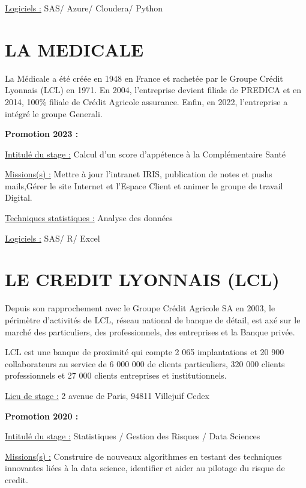 \documentclass[
  letterpaper,
  DIV=11,
  numbers=noendperiod]{scrreprt}
\begin{document}
\uline{Logiciels :} SAS/ Azure/ Cloudera/ Python

\hypertarget{la-medicale}{%
\section{\texorpdfstring{\textbf{LA
MEDICALE}}{LA MEDICALE}}\label{la-medicale}}

La Médicale a été créée en 1948 en France et rachetée par le Groupe
Crédit Lyonnais (LCL) en 1971. En 2004, l'entreprise devient filiale de
PREDICA et en 2014, 100\% filiale de Crédit Agricole assurance. Enfin,
en 2022, l'entreprise a intégré le groupe Generali.

\textbf{Promotion 2023 :}

\uline{Intitulé du stage :} Calcul d'un score d'appétence à la
Complémentaire Santé

\uline{Missions(s) :} Mettre à jour l'intranet IRIS, publication de
notes et pushs mails,Gérer le site Internet et l'Espace Client et animer
le groupe de travail Digital.

\uline{Techniques statistiques :} Analyse des données

\uline{Logiciels :} SAS/ R/ Excel

\hypertarget{le-credit-lyonnais-lcl}{%
\section{\texorpdfstring{\textbf{LE CREDIT LYONNAIS
(LCL)}}{LE CREDIT LYONNAIS (LCL)}}\label{le-credit-lyonnais-lcl}}

Depuis son rapprochement avec le Groupe Crédit Agricole SA en 2003, le
périmètre d'activités de LCL, réseau national de banque de détail, est
axé sur le marché des particuliers, des professionnels, des entreprises
et la Banque privée.

LCL est une banque de proximité qui compte 2 065 implantations et 20 900
collaborateurs au service de 6 000 000 de clients particuliers, 320 000
clients professionnels et 27 000 clients entreprises et institutionnels.

\uline{Lieu de stage :} 2 avenue de Paris, 94811 Villejuif Cedex

\textbf{Promotion 2020 :}

\uline{Intitulé du stage :} Statistiques / Gestion des Risques / Data
Sciences

\uline{Missions(s) :} Construire de nouveaux algorithmes en testant des
techniques innovantes liées à la data science, identifier et aider au
pilotage du risque de credit.
\end{document}
